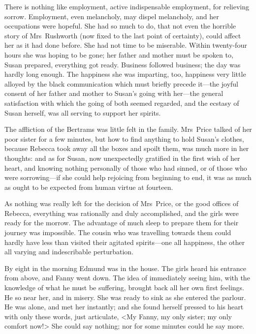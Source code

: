There is nothing like employment, active indispensable employment, for relieving sorrow. Employment, even melancholy, may dispel melancholy, and her occupations were hopeful. She had so much to do, that not even the horrible story of Mrs~Rushworth (now fixed to the last point of certainty), could affect her as it had done before. She had not time to be miserable. Within twenty-four hours she was hoping to be gone; her father and mother must be spoken to, Susan prepared, everything got ready. Business followed business; the day was hardly long enough. The happiness she was imparting, too, happiness very little alloyed by the black communication which must briefly precede it—the joyful consent of her father and mother to Susan's going with her—the general satisfaction with which the going of both seemed regarded, and the ecstasy of Susan herself, was all serving to support her spirits.

The affliction of the Bertrams was little felt in the family. Mrs~Price talked of her poor sister for a few minutes, but how to find anything to hold Susan's clothes, because Rebecca took away all the boxes and spoilt them, was much more in her thoughts: and as for Susan, now unexpectedly gratified in the first wish of her heart, and knowing nothing personally of those who had sinned, or of those who were sorrowing—if she could help rejoicing from beginning to end, it was as much as ought to be expected from human virtue at fourteen.

As nothing was really left for the decision of Mrs~Price, or the good offices of Rebecca, everything was rationally and duly accomplished, and the girls were ready for the morrow. The advantage of much sleep to prepare them for their journey was impossible. The cousin who was travelling towards them could hardly have less than visited their agitated spirits—one all happiness, the other all varying and indescribable perturbation.

By eight in the morning Edmund was in the house. The girls heard his entrance from above, and Fanny went down. The idea of immediately seeing him, with the knowledge of what he must be suffering, brought back all her own first feelings. He so near her, and in misery. She was ready to sink as she entered the parlour. He was alone, and met her instantly; and she found herself pressed to his heart with only these words, just articulate, <My Fanny, my only sister; my only comfort now!> She could say nothing; nor for some minutes could he say more.

